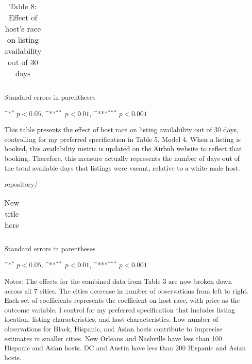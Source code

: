 

\begin{table}[htbp]\centering
	\def\sym#1{\ifmmode^{#1}\else\(^{#1}\)\fi}
	\caption{Table 8: Effect of host’s race on listing availability out of 30 days}
	\label{table:availability_30_new}
	\begin{tabular}{c|c}
		\toprule
		
		
		
		\bottomrule
	\end{tabular}
	
	\begin{tablenotes}
		\item \footnotesize Standard errors in parentheses
		\item \footnotesize \sym{*} \(p<0.05\), \sym{**} \(p<0.01\), \sym{***} \(p<0.001\)
		\item This table presents the effect of host race on listing availability out of 30 days, controlling for my preferred specification in Table 5, Model 4. When a listing is booked, this availability metric is updated on the Airbnb website to reflect that booking. Therefore, this measure actually represents the number of days out of the total available days that listings were vacant, relative to a white male host. \end{tablenotes}
\end{table}

repository/




\begin{table}[htbp]\centering
	\def\sym#1{\ifmmode^{#1}\else\(^{#1}\)\fi}
	\caption{New title here}
	\label{table:robustcity_new}
	\begin{tabular}{c|ccccccc}
		\toprule
		
		
		
		\bottomrule
	\end{tabular}
	
	\begin{tablenotes}
		\item \footnotesize Standard errors in parentheses
		\item \footnotesize \sym{*} \(p<0.05\), \sym{**} \(p<0.01\), \sym{***} \(p<0.001\)
		
		\item Notes: The effects for the combined data from Table 3 are now broken down across all 7 cities. The cities decrease in number of observations from left to right. Each set of coefficients represents the coefficient on host race, with price as the outcome variable. I control for my preferred specification that includes listing location, listing characteristics, and host characteristics. Low number of observations for Black, Hispanic, and Asian hosts contribute to imprecise estimates in smaller cities. New Orleans and Nashville have less than 100 Hispanic and Asian hosts. DC and Austin have less than 200 Hispanic and Asian hosts. \end{tablenotes}
\end{table}

